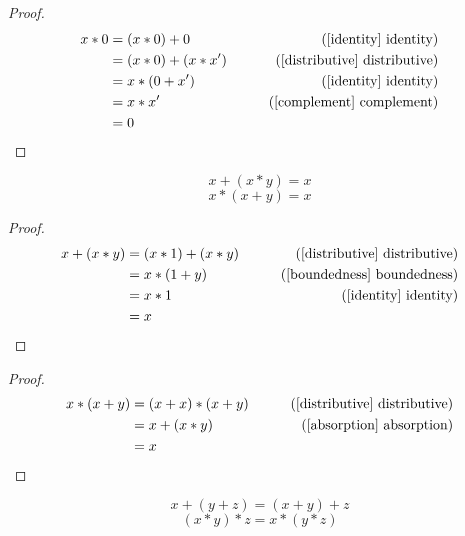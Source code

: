 \begin{proof}
\begin{align*}
x * 0 & = (x * 0) + 0        & \tag{\ref{identity} identity}  \\
      & = (x * 0) + (x * x') & \tag{\ref{distributive} distributive} \\
      & = x * (0 + x')       & \tag{\ref{identity} identity} \\
      & = x * x'             & \tag{\ref{complement} complement} \\
      & = 0
\end{align*}
\end{proof}

\newpage
\begin{theorem}
\label{absorption}
\[ x + (x * y) = x \]
\[ x * (x + y) = x \]
\end{theorem}

\begin{proof}
\begin{align*}
x + (x * y) & = (x * 1) + (x * y) & \tag{\ref{distributive} distributive} \\
            & = x * (1 + y)       & \tag{\ref{boundedness} boundedness} \\
            & = x * 1             & \tag{\ref{identity} identity} \\
            & = x
\end{align*}
\end{proof}

\begin{proof}
\begin{align*}
x * (x + y) & = (x + x) * (x + y) & \tag{\ref{distributive} distributive} \\
            & = x + (x * y)       & \tag{\ref{absorption} absorption} \\
            & = x
\end{align*}
\end{proof}

\newpage

\begin{theorem}
\label{associative}
\[ x + (y + z) = (x + y) + z \]
\[ (x * y) * z = x * (y * z) \]
\end{theorem}

